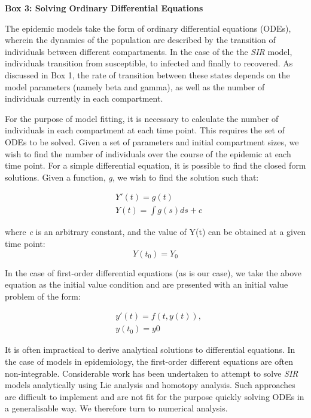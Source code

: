 \newpage
\begin{framed}
{\begin{center}{\bf Box 3: Solving Ordinary Differential Equations}\end{center}}

The epidemic models take the form of ordinary differential
equations (ODEs), wherein the dynamics of the population are described by the
transition of individuals between different compartments. In the case
of the the \emph{SIR} model, individuals transition from susceptible,
to infected and finally to recovered. As discussed in Box 1, the rate
of transition between these states depends on the model parameters
(namely beta and gamma), as well as the number of individuals
currently in each compartment. 

For the purpose of model fitting, it is necessary to calculate the
number of individuals in each compartment at each time point. This
requires the set of ODEs to be solved. Given a set of parameters and
initial compartment sizes, we wish to find the number of individuals
over the course of the epidemic at each time point. For a simple
differential equation, it is possible to find the closed form
solutions. Given a function, \emph{g}, we wish to find the solution
such that:

\begin{equation}
\begin{split}
  &Y'(t) = g(t)\\
  &Y(t) = \int g(s)ds+c
\end{split}
\end{equation}

where \emph{c} is an arbitrary constant, and the value of Y(t) can be
obtained at a given time point: \begin{equation} Y(t_0) = Y_0 \end{equation}

In the case of
first-order differential equations (as is our case), we take the above
equation as the initial value condition and are presented
with an initial value problem of the form:\cite{atkinson} 

\begin{equation}
\begin{split}
  &y'(t) = f(t,y(t)),\\
  &y(t_0) = y0
 \end{split}
 \end{equation}

It is often impractical to derive analytical solutions to
differential equations. In the case of models in epidemiology, the
first-order different equations are often
non-integrable.\cite{shabbir} Considerable work has been undertaken to attempt to solve
\emph{SIR} models analytically using Lie analysis and homotopy
analysis.\cite{nucci, khan} Such approaches are difficult to implement
and are not fit for the purpose quickly solving ODEs in a
generalisable way. We therefore turn to numerical
analysis.


\end{framed}
